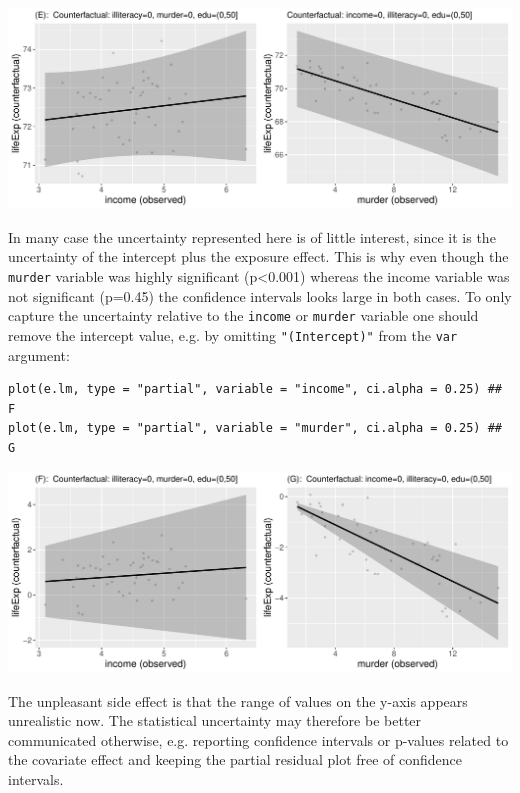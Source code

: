 \documentclass[12pt]{article}
\begin{document}
\begin{center}
\includegraphics[trim={0 0 0 0},width=1\textwidth]{./figures/gg-lmpres-cifit.pdf}
\end{center}

In many case the uncertainty represented here is of little interest,
since it is the uncertainty of the intercept plus the exposure
effect. This is why even though the \texttt{murder} variable was highly
significant (p<0.001) whereas the income variable was not significant
(p=0.45) the confidence intervals looks large in both cases. To only
capture the uncertainty relative to the \texttt{income} or \texttt{murder} variable
one should remove the intercept value, e.g. by omitting
\texttt{"(Intercept)"} from the \texttt{var} argument:
\lstset{language=r,label= ,caption= ,captionpos=b,numbers=none}
\begin{lstlisting}
plot(e.lm, type = "partial", variable = "income", ci.alpha = 0.25) ## F
plot(e.lm, type = "partial", variable = "murder", ci.alpha = 0.25) ## G
\end{lstlisting}
\begin{center}
\includegraphics[trim={0 0 0 0},width=1\textwidth]{./figures/gg-lmpres-cicov.pdf}
\end{center}

The unpleasant side effect is that the range of values on the y-axis
appears unrealistic now. The statistical uncertainty may therefore be
better communicated otherwise, e.g. reporting confidence intervals or
p-values related to the covariate effect and keeping the partial
residual plot free of confidence intervals.
\end{document}
